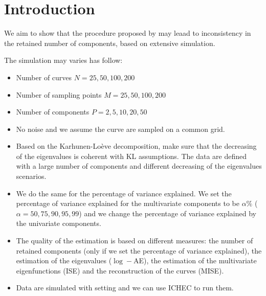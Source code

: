 \section{Introduction} %
\label{sec:introduction}

We aim to show that the procedure proposed by \cite{happMultivariateFunctionalPrincipal2018a} may leaad to inconsistency in the retained number of components, based on extensive simulation.

The simulation may varies has follow:
\begin{itemize}
    \item Number of curves $N = 25, 50, 100, 200$
    \item Number of sampling points $M = 25, 50, 100, 200$
    \item Number of components $P = 2, 5, 10, 20, 50$
    \item No noise and we assume the curve are sampled on a common grid.
    \item Based on the Karhunen-Loève decomposition, make sure that the decreasing of the eigenvalues is coherent with KL assumptions. The data are defined with a large number of components and different decreasing of the eigenvalues scenarios.
    \item We do the same for the percentage of variance explained. We set the percentage of variance explained for the multivariate components to be $\alpha\%$ ($\alpha = 50, 75, 90, 95, 99$) and we change the percentage of variance explained by the univariate components.
    \item The quality of the estimation is based on different measures: the number of retained components (only if we set the percentage of variance explained), the estimation of the eigenvalues ($\log-$AE), the estimation of the multivariate eigenfunctions (ISE) and the reconstruction of the curves (MISE).
    \item Data are simulated with \cite{happMultivariateFunctionalPrincipal2018a} setting and we can use ICHEC to run them.
\end{itemize}
